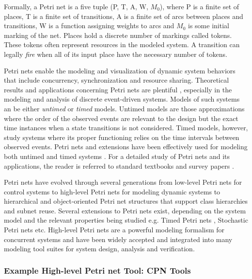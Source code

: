Formally, a Petri net is a five tuple (P, T, A, W, $M_0$), where P is a finite set of places, T is a finite set of transitions, A is a finite set of arcs between places and transitions, W is a function assigning weights to arcs and $M_0$ is some initial marking of the net. Places hold a discrete number of markings called tokens. These tokens often represent resources in the modeled system. A transition can legally \emph{fire} when all of its input place have the necessary number of tokens. 

Petri nets enable the modeling and visualization of dynamic system behaviors that include concurrency, synchronization and resource sharing. Theoretical results and applications concerning Petri nets are plentiful \cite{david1994petri, holloway1997survey}, especially in the modeling and analysis of discrete event-driven systems. Models of such systems an be either \emph{untimed} or \emph{timed} models. Untimed models are those approximations where the order of the observed events are relevant to the design but the exact time instances when a state transitions is not considered. Timed models, however, study systems where its proper functioning relies on the time intervals between observed events. Petri nets and extensions have been effectively used for modeling both untimed \cite{holloway1997survey} and timed systems \cite{zuberek1991timed}. For a detailed study of Petri nets and its applications, the reader is referred to standard textbooks \cite{peterson1977petri, reisig2012petri} and survey papers \cite{murata1989petri, zhou1999modeling, zurawski1994petri}.

Petri nets have evolved through several generations from low-level Petri nets for control systems \cite{reisig2012petri} to high-level Petri nets for modeling dynamic systems \cite{jensen2012high} to hierarchical and object-oriented Petri net structures \cite{de2001object} that support class hierarchies and subnet reuse. Several extensions to Petri nets exist, depending on the system model and the relevant properties being studied e.g. Timed Petri nets \cite{wang2012timed}, Stochastic Petri nets \cite{bause1996stochastic, marsan1994modelling} etc. High-level Petri nets are a powerful modeling formalism for concurrent systems and have been widely accepted and integrated into many modeling tool suites for system design, analysis and verification. 

\subsubsection{Example High-level Petri net Tool: CPN Tools}

